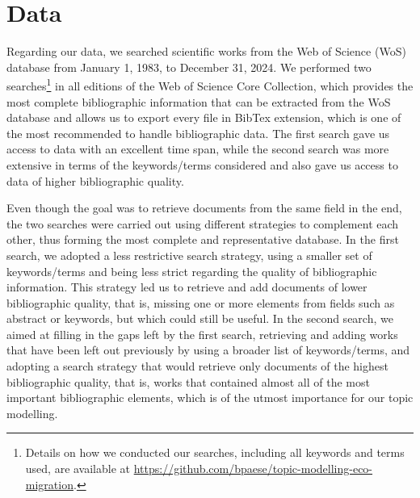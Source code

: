 \section{Data} \label{data}

Regarding our data, we searched scientific works from the Web of Science (WoS) database from January 1, 1983, to December 31, 2024. We performed two searches\footnote{Details on how we conducted our searches, including all keywords and terms used, are available at \url{https://github.com/bpaese/topic-modelling-eco-migration}.} in all editions of the Web of Science Core Collection, which provides the most complete bibliographic information that can be extracted from the WoS database and allows us to export every file in BibTex extension, which is one of the most recommended to handle bibliographic data. The first search gave us access to data with an excellent time span, while the second search was more extensive in terms of the keywords/terms considered and also gave us access to data of higher bibliographic quality.

Even though the goal was to retrieve documents from the same field in the end, the two searches were carried out using different strategies to complement each other, thus forming the most complete and representative database. In the first search, we adopted a less restrictive search strategy, using a smaller set of keywords/terms and being less strict regarding the quality of bibliographic information. This strategy led us to retrieve and add documents of lower bibliographic quality, that is, missing one or more elements from fields such as abstract or keywords, but which could still be useful. In the second search, we aimed at filling in the gaps left by the first search, retrieving and adding works that have been left out previously by using a broader list of keywords/terms, and adopting a search strategy that would retrieve only documents of the highest bibliographic quality, that is, works that contained almost all of the most important bibliographic elements, which is of the utmost importance for our topic modelling.

